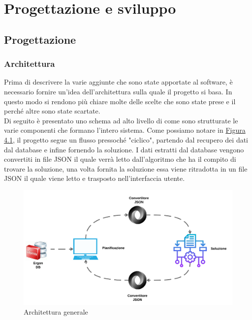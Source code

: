 
\chapter{Progettazione e sviluppo}
\label{cap:progettazione}

\section{Progettazione}
\subsection{Architettura}

Prima di descrivere la varie aggiunte che sono state apportate al software, è necessario fornire un'idea dell'architettura sulla quale il progetto si basa. In questo modo si 
rendono più chiare molte delle scelte che sono state prese e il perché altre sono state scartate.\\ Di seguito è presentato uno schema ad alto livello di come sono strutturate le
varie componenti che formano l'intero sistema. Come possiamo notare in \hyperref[4.1]{Figura 4.1}, il progetto segue un flusso pressoché "ciclico", partendo dal recupero dei dati dal
database e infine fornendo la soluzione. I dati estratti dal database vengono convertiti in file JSON il quale verrà letto dall'algoritmo che ha il compito di trovare la soluzione,
una volta fornita la soluzione essa viene ritradotta in un file JSON il quale viene letto e trasposto nell'interfaccia utente.

\begin{figure}[H]
	\includegraphics[width=13cm]{immagini/architettura.png}
	\centering
    \caption{Architettura generale}
    \label{4.1}
\end{figure}

